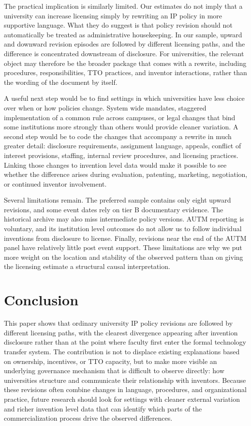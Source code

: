 The practical implication is similarly limited. Our estimates do not imply that a university can increase licensing simply by rewriting an IP policy in more supportive language. What they do suggest is that policy revision should not automatically be treated as administrative housekeeping. In our sample, upward and downward revision episodes are followed by different licensing paths, and the difference is concentrated downstream of disclosure. For universities, the relevant object may therefore be the broader package that comes with a rewrite, including procedures, responsibilities, TTO practices, and inventor interactions, rather than the wording of the document by itself.

A useful next step would be to find settings in which universities have less choice over when or how policies change. System wide mandates, staggered implementation of a common rule across campuses, or legal changes that bind some institutions more strongly than others would provide cleaner variation. A second step would be to code the changes that accompany a rewrite in much greater detail: disclosure requirements, assignment language, appeals, conflict of interest provisions, staffing, internal review procedures, and licensing practices. Linking those changes to invention level data would make it possible to see whether the difference arises during evaluation, patenting, marketing, negotiation, or continued inventor involvement.

Several limitations remain. The preferred sample contains only eight upward revisions, and some event dates rely on tier B documentary evidence. The historical archive may also miss intermediate policy versions. AUTM reporting is voluntary, and its institution level outcomes do not allow us to follow individual inventions from disclosure to license. Finally, revisions near the end of the AUTM panel have relatively little post event support. These limitations are why we put more weight on the location and stability of the observed pattern than on giving the licensing estimate a structural causal interpretation.

\section{Conclusion}\label{sec:conclusion}

This paper shows that ordinary university IP policy revisions are followed by different licensing paths, with the clearest divergence appearing after invention disclosure rather than at the point where faculty first enter the formal technology transfer system. The contribution is not to displace existing explanations based on ownership, incentives, or TTO capacity, but to make more visible an underlying governance mechanism that is difficult to observe directly: how universities structure and communicate their relationship with inventors. Because these revisions often combine changes in language, procedures, and organizational practice, future research should look for settings with cleaner external variation and richer invention level data that can identify which parts of the commercialization process drive the observed differences.

